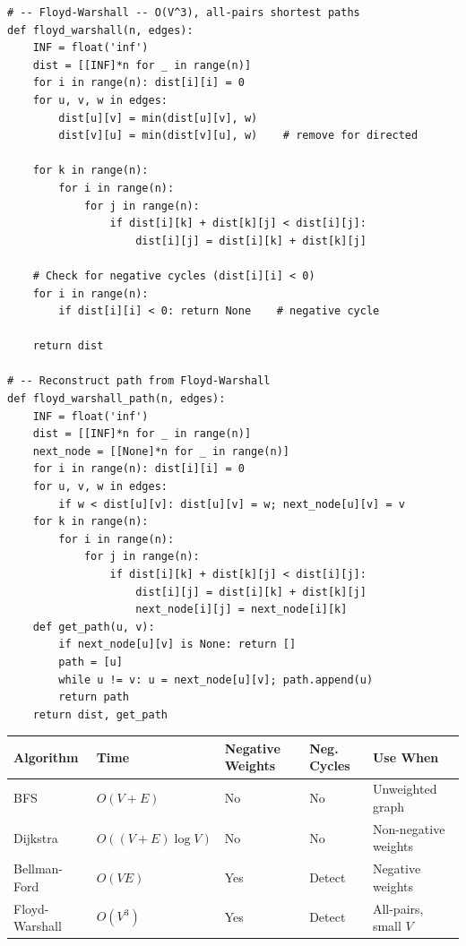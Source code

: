 \documentclass[11pt,a4paper]{report}
\begin{document}
\begin{lstlisting}
# -- Floyd-Warshall -- O(V^3), all-pairs shortest paths
def floyd_warshall(n, edges):
    INF = float('inf')
    dist = [[INF]*n for _ in range(n)]
    for i in range(n): dist[i][i] = 0
    for u, v, w in edges:
        dist[u][v] = min(dist[u][v], w)
        dist[v][u] = min(dist[v][u], w)    # remove for directed

    for k in range(n):
        for i in range(n):
            for j in range(n):
                if dist[i][k] + dist[k][j] < dist[i][j]:
                    dist[i][j] = dist[i][k] + dist[k][j]

    # Check for negative cycles (dist[i][i] < 0)
    for i in range(n):
        if dist[i][i] < 0: return None    # negative cycle

    return dist

# -- Reconstruct path from Floyd-Warshall
def floyd_warshall_path(n, edges):
    INF = float('inf')
    dist = [[INF]*n for _ in range(n)]
    next_node = [[None]*n for _ in range(n)]
    for i in range(n): dist[i][i] = 0
    for u, v, w in edges:
        if w < dist[u][v]: dist[u][v] = w; next_node[u][v] = v
    for k in range(n):
        for i in range(n):
            for j in range(n):
                if dist[i][k] + dist[k][j] < dist[i][j]:
                    dist[i][j] = dist[i][k] + dist[k][j]
                    next_node[i][j] = next_node[i][k]
    def get_path(u, v):
        if next_node[u][v] is None: return []
        path = [u]
        while u != v: u = next_node[u][v]; path.append(u)
        return path
    return dist, get_path
\end{lstlisting}

\begin{compbox}
\begin{tabular}{@{}lllll@{}}
\toprule
\textbf{Algorithm} & \textbf{Time} & \textbf{Negative Weights} & \textbf{Neg. Cycles} & \textbf{Use When} \\
\midrule
BFS              & $O(V+E)$      & No           & No   & Unweighted graph \\
Dijkstra         & $O((V+E)\log V)$ & No        & No   & Non-negative weights \\
Bellman-Ford     & $O(VE)$       & Yes          & Detect & Negative weights \\
Floyd-Warshall   & $O(V^3)$      & Yes          & Detect & All-pairs, small $V$ \\
\bottomrule
\end{tabular}
\end{compbox}
\end{document}

